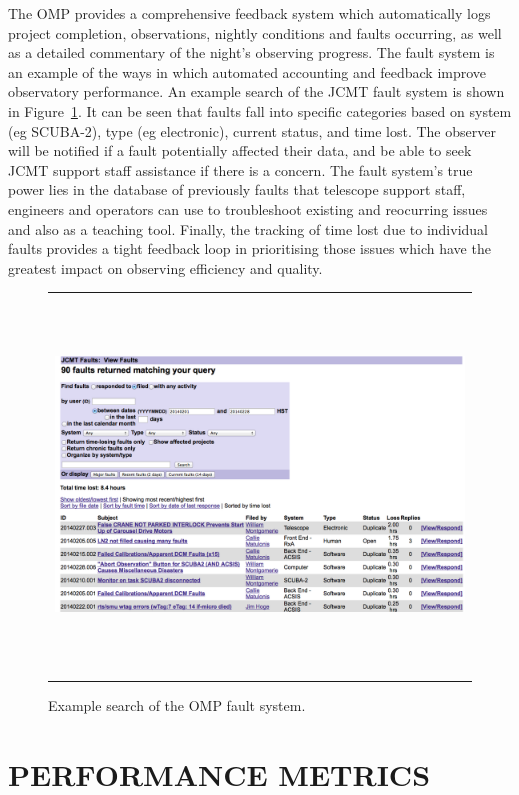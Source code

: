 \documentclass[]{spie}  %
\begin{document}
The OMP provides a comprehensive feedback system which automatically
logs project completion, observations, nightly conditions and faults
occurring, as well as a detailed commentary of the night's observing
progress. The fault system is an example of the ways in which
automated accounting and feedback improve observatory performance. An
example search of the JCMT fault system is shown in
Figure~\ref{fig:faulteg}. It can be seen that faults fall into
specific categories based on system (eg SCUBA-2), type (eg
electronic), current status, and time lost. The observer will be
notified if a fault potentially affected their data, and be able to
seek JCMT support staff assistance if there is a concern. The fault
system's true power lies in the database of previously faults that
telescope support staff, engineers and operators can use to
troubleshoot existing and reocurring issues and also as a teaching
tool. Finally, the tracking of time lost due to individual faults
provides a tight feedback loop in prioritising those issues which have
the greatest impact on observing efficiency and quality.

 \begin{figure}[ht]
   \begin{center}
   \begin{tabular}{c}
   \includegraphics[height=10cm]{faultexample.png}
   \end{tabular}
   \end{center}
   \caption{\label{fig:faulteg}Example search of the OMP fault system.}
\end{figure}


\section{PERFORMANCE METRICS} \label{sec:metrics}
\end{document}
